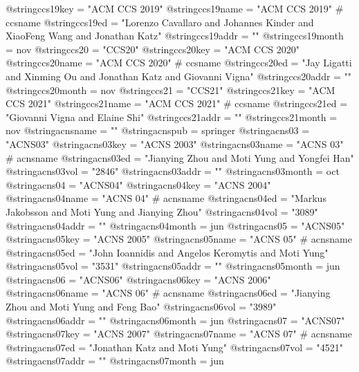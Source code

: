 @string{ccs19key =              "ACM CCS 2019"}
@string{ccs19name =             "ACM CCS 2019" # ccsname}
@string{ccs19ed =               "Lorenzo Cavallaro and Johannes Kinder and XiaoFeng Wang and Jonathan Katz"}
@string{ccs19addr =             ""}
@string{ccs19month =            nov}
@string{ccs20 =                 "CCS20"}
@string{ccs20key =              "ACM CCS 2020"}
@string{ccs20name =             "ACM CCS 2020" # ccsname}
@string{ccs20ed =               "Jay Ligatti and Xinming Ou and Jonathan Katz and Giovanni Vigna"}
@string{ccs20addr =             ""}
@string{ccs20month =            nov}
@string{ccs21 =                 "CCS21"}
@string{ccs21key =              "ACM CCS 2021"}
@string{ccs21name =             "ACM CCS 2021" # ccsname}
@string{ccs21ed =               "Giovanni Vigna and Elaine Shi"}
@string{ccs21addr =             ""}
@string{ccs21month =            nov}
@string{acnsname =              ""}
@string{acnspub =               springer}
@string{acns03 =                "ACNS03"}
@string{acns03key =             "ACNS 2003"}
@string{acns03name =            "ACNS 03" # acnsname}
@string{acns03ed =              "Jianying Zhou and Moti Yung and Yongfei Han"}
@string{acns03vol =             "2846"}
@string{acns03addr =            ""}
@string{acns03month =           oct}
@string{acns04 =                "ACNS04"}
@string{acns04key =             "ACNS 2004"}
@string{acns04name =            "ACNS 04" # acnsname}
@string{acns04ed =              "Markus Jakobsson and Moti Yung and Jianying Zhou"}
@string{acns04vol =             "3089"}
@string{acns04addr =            ""}
@string{acns04month =           jun}
@string{acns05 =                "ACNS05"}
@string{acns05key =             "ACNS 2005"}
@string{acns05name =            "ACNS 05" # acnsname}
@string{acns05ed =              "John Ioannidis and Angelos Keromytis and Moti Yung"}
@string{acns05vol =             "3531"}
@string{acns05addr =            ""}
@string{acns05month =           jun}
@string{acns06 =                "ACNS06"}
@string{acns06key =             "ACNS 2006"}
@string{acns06name =            "ACNS 06" # acnsname}
@string{acns06ed =              "Jianying Zhou and Moti Yung and Feng Bao"}
@string{acns06vol =             "3989"}
@string{acns06addr =            ""}
@string{acns06month =           jun}
@string{acns07 =                "ACNS07"}
@string{acns07key =             "ACNS 2007"}
@string{acns07name =            "ACNS 07" # acnsname}
@string{acns07ed =              "Jonathan Katz and Moti Yung"}
@string{acns07vol =             "4521"}
@string{acns07addr =            ""}
@string{acns07month =           jun}
